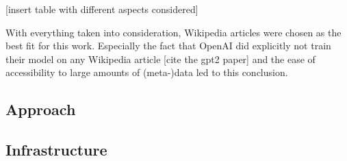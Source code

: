 [insert table with different aspects considered]

With everything taken into consideration, Wikipedia articles were chosen as the best fit for this work. 
Especially the fact that OpenAI did explicitly not train their model on any Wikipedia article [cite the gpt2 paper] 
and the ease of accessibility to large amounts of (meta-)data led to this conclusion.







\subsection{Approach}
\label{sec:approach}

\subsection{Infrastructure}
\label{sec:infrastructure}

